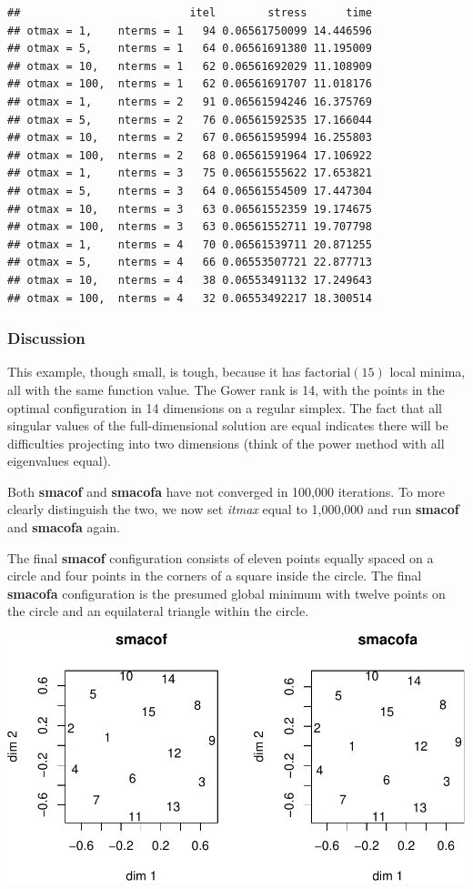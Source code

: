 \documentclass[
  12pt,
]{article}
\begin{document}
\begin{verbatim}
##                          itel        stress      time
## otmax = 1,    nterms = 1   94 0.06561750099 14.446596
## otmax = 5,    nterms = 1   64 0.06561691380 11.195009
## otmax = 10,   nterms = 1   62 0.06561692029 11.108909
## otmax = 100,  nterms = 1   62 0.06561691707 11.018176
## otmax = 1,    nterms = 2   91 0.06561594246 16.375769
## otmax = 5,    nterms = 2   76 0.06561592535 17.166044
## otmax = 10,   nterms = 2   67 0.06561595994 16.255803
## otmax = 100,  nterms = 2   68 0.06561591964 17.106922
## otmax = 1,    nterms = 3   75 0.06561555622 17.653821
## otmax = 5,    nterms = 3   64 0.06561554509 17.447304
## otmax = 10,   nterms = 3   63 0.06561552359 19.174675
## otmax = 100,  nterms = 3   63 0.06561552711 19.707798
## otmax = 1,    nterms = 4   70 0.06561539711 20.871255
## otmax = 5,    nterms = 4   66 0.06553507721 22.877713
## otmax = 10,   nterms = 4   38 0.06553491132 17.249643
## otmax = 100,  nterms = 4   32 0.06553492217 18.300514
\end{verbatim}

\subsubsection{Discussion}\label{discussion-1}

This example, though small, is tough, because it has \(\text{factorial}(15)\) local minima, all
with the same function value. The Gower rank is 14, with the points in the
optimal configuration in 14 dimensions on a regular simplex. The fact that
all singular values of the full-dimensional solution are equal indicates
there will be difficulties projecting into two dimensions (think of
the power method with all eigenvalues equal).

Both \textbf{smacof} and \textbf{smacofa} have not converged in 100,000 iterations.
To more clearly distinguish the two, we now set \emph{itmax} equal to 1,000,000 and
run \textbf{smacof} and \textbf{smacofa} again.

The final \textbf{smacof} configuration consists of eleven points equally spaced on a circle
and four points in the corners of a square inside the circle. The final \textbf{smacofa}
configuration is the presumed global minimum with twelve points on the circle and an equilateral triangle within the circle.

\includegraphics{mSmacof_files/figure-latex/equiplot-1.pdf}
\end{document}
